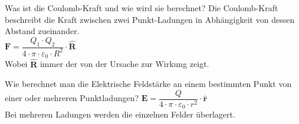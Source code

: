 \begin{lk}{Was ist die Coulomb-Kraft und wie wird sie berechnet?}
	Die Coulomb-Kraft beschreibt die Kraft zwischen zwei Punkt-Ladungen in Abhängigkeit von dessen Abstand zueinander.\\[12pt]
	\LARGE{ $ \bm{F} = \dfrac{Q_1 \cdot Q_2}{4 \cdot \pi \cdot \varepsilon_0 \cdot R^2} \cdot \bm{\hat{R}} $} \\[12pt]
	\normalsize Wobei $ \bm{\hat{R}} $ immer der von der Ursache zur Wirkung zeigt.
\end{lk}

\begin{lk}{Wie berechnet man die Elektrische Feldstärke an einem bestimmten Punkt von einer oder mehreren Punktladungen?}
	\LARGE{ $ \bm{E} = \dfrac{Q}{4 \cdot \pi \cdot \varepsilon_0 \cdot r^2} \cdot \bm{\hat{r}} $} \\[12pt]
	\normalsize  Bei mehreren Ladungen werden die einzelnen Felder überlagert.
\end{lk}